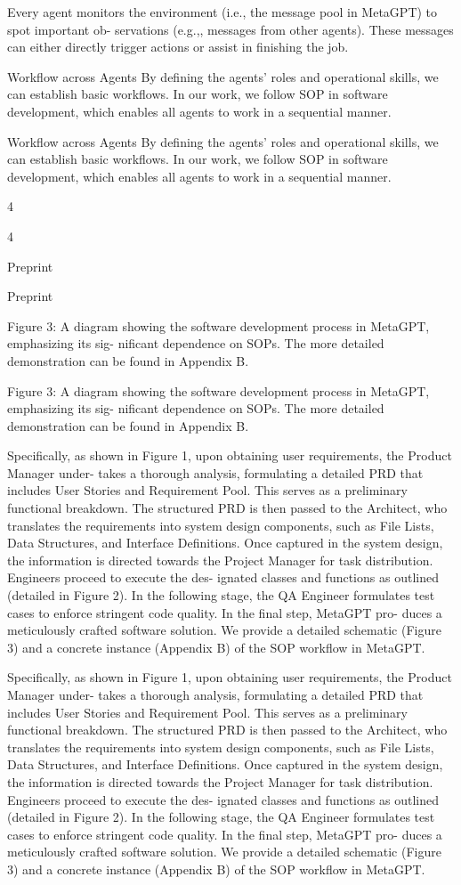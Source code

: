 \documentclass[12pt]{article}
\begin{document}
Every agent monitors the environment (i.e., the message pool in MetaGPT) to spot important ob-
servations (e.g.,, messages from other agents). These messages can either directly trigger actions or
assist in finishing the job.


Workflow across Agents By defining the agents’ roles and operational skills, we can establish
basic workflows. In our work, we follow SOP in software development, which enables all agents to
work in a sequential manner.


Workflow across Agents By defining the agents’ roles and operational skills, we can establish
basic workflows. In our work, we follow SOP in software development, which enables all agents to
work in a sequential manner.


4


4


Preprint


Preprint


Figure 3: A diagram showing the software development process in MetaGPT, emphasizing its sig-
nificant dependence on SOPs. The more detailed demonstration can be found in Appendix B.


Figure 3: A diagram showing the software development process in MetaGPT, emphasizing its sig-
nificant dependence on SOPs. The more detailed demonstration can be found in Appendix B.


Specifically, as shown in Figure 1, upon obtaining user requirements, the Product Manager under-
takes a thorough analysis, formulating a detailed PRD that includes User Stories and Requirement
Pool. This serves as a preliminary functional breakdown. The structured PRD is then passed to
the Architect, who translates the requirements into system design components, such as File Lists,
Data Structures, and Interface Definitions. Once captured in the system design, the information is
directed towards the Project Manager for task distribution. Engineers proceed to execute the des-
ignated classes and functions as outlined (detailed in Figure 2).
In the following stage, the QA
Engineer formulates test cases to enforce stringent code quality. In the final step, MetaGPT pro-
duces a meticulously crafted software solution. We provide a detailed schematic (Figure 3) and a
concrete instance (Appendix B) of the SOP workflow in MetaGPT.


Specifically, as shown in Figure 1, upon obtaining user requirements, the Product Manager under-
takes a thorough analysis, formulating a detailed PRD that includes User Stories and Requirement
Pool. This serves as a preliminary functional breakdown. The structured PRD is then passed to
the Architect, who translates the requirements into system design components, such as File Lists,
Data Structures, and Interface Definitions. Once captured in the system design, the information is
directed towards the Project Manager for task distribution. Engineers proceed to execute the des-
ignated classes and functions as outlined (detailed in Figure 2).
In the following stage, the QA
Engineer formulates test cases to enforce stringent code quality. In the final step, MetaGPT pro-
duces a meticulously crafted software solution. We provide a detailed schematic (Figure 3) and a
concrete instance (Appendix B) of the SOP workflow in MetaGPT.
\end{document}
